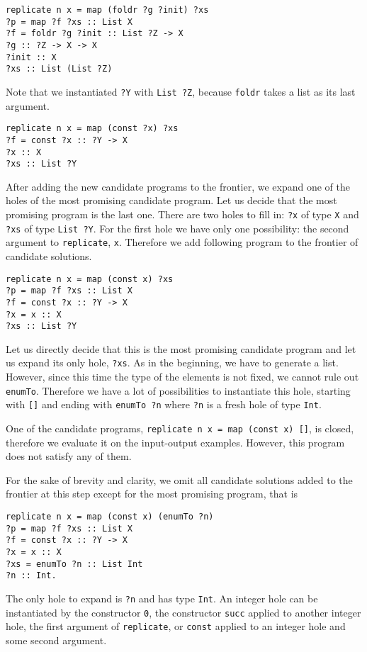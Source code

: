 \begin{lstlisting}[style=plain]
replicate n x = map (foldr ?g ?init) ?xs
?p = map ?f ?xs :: List X
?f = foldr ?g ?init :: List ?Z -> X
?g :: ?Z -> X -> X
?init :: X
?xs :: List (List ?Z)
\end{lstlisting}
Note that we instantiated \lstinline!?Y! with \lstinline!List ?Z!, because \lstinline?foldr? takes a list as its last argument.

\begin{lstlisting}[style=plain]
replicate n x = map (const ?x) ?xs
?f = const ?x :: ?Y -> X
?x :: X
?xs :: List ?Y
\end{lstlisting}

After adding the new candidate programs to the frontier, we expand one of the holes of the most promising candidate program. Let us decide that the most promising program is the last one.
There are two holes to fill in: \lstinline!?x! of type \lstinline!X! and \lstinline!?xs! of type \lstinline!List ?Y!. For the first hole we have only one possibility: the second argument to \lstinline!replicate!, \lstinline!x!. Therefore we add following program to the frontier of candidate solutions.

\begin{lstlisting}[style=plain]
replicate n x = map (const x) ?xs
?p = map ?f ?xs :: List X
?f = const ?x :: ?Y -> X
?x = x :: X
?xs :: List ?Y
\end{lstlisting}

Let us directly decide that this is the most promising candidate program and let us expand its only hole, \lstinline!?xs!.
As in the beginning, we have to generate a list. However, since this time the type of the elements is not fixed, we cannot rule out  \lstinline?enumTo?.
Therefore we have a lot of possibilities to instantiate this hole, starting with \lstinline?[]? and ending with \lstinline!enumTo ?n! where \lstinline!?n! is a fresh hole of type \lstinline!Int!.

One of the candidate programs, \lstinline?replicate n x = map (const x) []?, is closed, therefore we evaluate it on the input-output examples. However, this program does not satisfy any of them.

For the sake of brevity and clarity, we omit all candidate solutions added to the frontier at this step except for the most promising program, that is
\begin{lstlisting}[style=plain]
replicate n x = map (const x) (enumTo ?n)
?p = map ?f ?xs :: List X
?f = const ?x :: ?Y -> X
?x = x :: X
?xs = enumTo ?n :: List Int
?n :: Int.
\end{lstlisting}
The only hole to expand is \lstinline!?n! and has type \lstinline!Int!. An integer hole can be instantiated by the constructor \lstinline?0?, the constructor \lstinline?succ? applied to another integer hole, the first argument of \lstinline?replicate?, or \lstinline?const? applied to an integer hole and some second argument.

